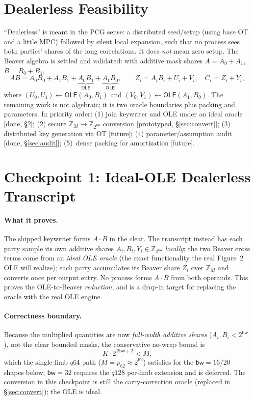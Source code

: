 \documentclass[11pt]{article}
\newcommand{\Z}{\mathbb{Z}}
\newcommand{\modtwo}{\Z_{2^{\mathsf{bw}}}}
\newcommand{\OLE}{\mathsf{OLE}}
\newcommand{\SPFSS}{\mathsf{SPFSS}}
\begin{document}
\section{Dealerless Feasibility}
\label{sec:feasibility}

``Dealerless'' is meant in the PCG sense: a distributed seed/setup (using base OT
and a little MPC) followed by silent local expansion, such that no process sees
both parties' shares of the long correlations. It does \emph{not} mean zero setup.
The Beaver algebra is settled and validated: with additive mask shares
$A=A_0+A_1$, $B=B_0+B_1$,
\[
  AB = A_0B_0 + A_1B_1 + \underbrace{A_0B_1}_{\OLE} + \underbrace{A_1B_0}_{\OLE},
  \qquad
  Z_i = A_iB_i + U_i + V_i, \quad C_i = Z_i + Y_i,
\]
where $(U_0,U_1)\leftarrow\OLE(A_0,B_1)$ and $(V_0,V_1)\leftarrow\OLE(A_1,B_0)$.
The remaining work is not algebraic; it is two oracle boundaries plus packing and
parameters. In priority order: (1) join keywriter and OLE under an ideal oracle
[done, \S\ref{sec:transcript}]; (2) secure $\Z_M\!\to\!\modtwo$ conversion
[prototyped, \S\ref{sec:convert}]; (3) distributed \SPFSS{} key generation via OT
[future]; (4) parameter/assumption audit [done, \S\ref{sec:audit}]; (5)~dense
packing for amortization [future].

\section{Checkpoint 1: Ideal-OLE Dealerless Transcript}
\label{sec:transcript}

\paragraph{What it proves.} The shipped keywriter forms $A\cdot B$ in the clear.
The transcript instead has each party sample its own additive shares
$A_i,B_i,Y_i\in\modtwo$ \emph{locally}; the two Beaver cross terms come from an
\emph{ideal OLE oracle} (the exact functionality the real Figure~2 OLE will
realize); each party accumulates its Beaver share $Z_i$ over $\Z_M$ and converts
once per output entry. No process forms $A\cdot B$ from both operands. This proves
the OLE-to-Beaver \emph{reduction}, and is a drop-in target for replacing the
oracle with the real OLE engine.

\paragraph{Correctness boundary.} Because the multiplied quantities are now
\emph{full-width additive shares} ($A_i,B_i<2^{\mathsf{bw}}$), not the clear
bounded masks, the conservative no-wrap bound is
\[
  K\cdot 2^{\,2\mathsf{bw}+2} < M ,
\]
which the single-limb $q64$ path ($M=p_{62}\approx 2^{62}$) satisfies for the
$\mathsf{bw}=16$/$20$ shapes below; $\mathsf{bw}=32$ requires the $q128$ per-limb
extension and is deferred. The conversion in this checkpoint is still the
carry-correction oracle (replaced in \S\ref{sec:convert}); the OLE is ideal.
\end{document}
